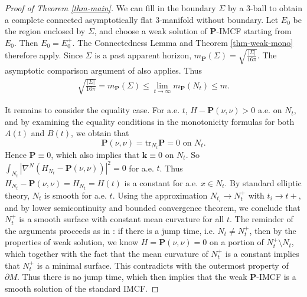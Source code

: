 \documentclass[11pt,letterpaper]{amsart}
\theoremstyle{definition}
\theoremstyle{remark}
\newcommand{\Pten}{\mathbf P}
\begin{document}
\begin{proof}[Proof of Theorem \ref{thm-main}]
	We can fill in the boundary $\Sigma $ by a $3$-ball to obtain a complete connected asymptotically flat $3$-manifold without boundary. Let $E_0$ be the region enclosed by $\Sigma $, and choose a weak solution of $\Pten$-IMCF starting from $E_0$. Then $E_0 = E_0 ^{+}$. The Connectedness Lemma and Theorem \ref{thm-weak-mono} therefore apply. Since $\Sigma $ is a past apparent horizon, $m_{\Pten}(\Sigma ) = \sqrt{\frac{|\Sigma |}{16 \pi }} $. The asymptotic comparison argument of \cite[Section 7]{Dong26SigmaIMCF} also applies. Thus
	\begin{align*}
		 \sqrt{\frac{|\Sigma |}{16 \pi }} = m_{\Pten}(\Sigma ) \leq \lim_{t\to \infty} m_{\Pten}(N_t) \leq m. 
	\end{align*} 

It remains to consider the equality case. For a.e. $t$, $H - \mathbf{P}(\nu ,\nu ) >0 $ a.e. on $N_{t}$, and by examining the equality conditions in the monotonicity formulas for both $A(t)$ and $B(t)$, we obtain that
\[
\Pten(\nu,\nu)=\mathrm{tr}_{N_t}\Pten=0 \text{ on } N_{t}.
\]
Hence $\Pten\equiv 0$, which also implies that $\mathbf{k} \equiv 0$ on $N_{t}$. So $\int_{N_t} |\nabla ^{N} (H_{N_t}- \mathbf{P}(\nu ,\nu ) )|^2 =0 $ for a.e. $t$. Thus $H_{N_t}- \mathbf{P}(\nu ,\nu ) = H_{N_t} = H(t)$ is a constant for a.e. $x \in N_t$. By standard elliptic theory, $N_{t}$ is smooth for a.e. $t$. Using the approximation $N_{t_i} \to N_{t}^{+}$ with $t_i \to t+$, and by lower semicontinuity and bounded convergence theorem, we conclude that $N_{t}^{+}$ is a smooth surface with constant mean curvature for all $t$. The reminder of the arguments proceeds as in \cite[Section 7]{Dong26SigmaIMCF}: if there is a jump time, i.e. $N_{t} \neq N_{t}^{+}$, then by the properties of weak solution, we know $H=\mathbf{P}(\nu ,\nu ) =0$ on a portion of $N_{t} ^{+} \setminus N_{t}$, which together with the fact that the mean curvature of $N_{t}^{+}$ is a constant implies that $N_{t}^{+}$ is a minimal surface. This contradicts with the outermost property of $\partial M$. Thus there is no jump time, which then implies that the weak $\mathbf{P}$-IMCF is a smooth solution of the standard IMCF. 
\end{proof}







\enlargethispage{3\baselineskip}


\end{document}
